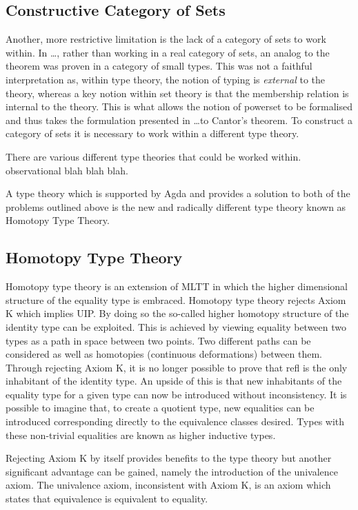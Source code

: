 \subsection{Constructive Category of Sets}
\label{section:hott}
Another, more restrictive limitation is the lack of a category of sets to work
within. In \ldots {}, rather than working in a
real category of sets, an analog to the theorem was proven in a category of
small types. This was not a faithful interpretation as, within type theory, the
notion of typing is \textit{external} to the theory, whereas a key notion within
set theory is that the membership relation is internal to the theory. This is
what allows the notion of powerset to be formalised and thus takes the
formulation presented in \ldots to Cantor's theorem. To construct a category of
sets it is necessary to work within a different type theory.

There are various different type theories that could be worked within.
observational blah blah blah.

A type theory which is supported by Agda and provides a solution to both of the
problems outlined above is the new and radically different type theory known as
Homotopy Type Theory.

\subsection{Homotopy Type Theory}

Homotopy type theory is an extension of MLTT in which the
higher dimensional structure of the equality type is embraced. Homotopy type
theory rejects \textsf{Axiom K} which implies UIP. By doing so the so-called higher
homotopy structure of the identity type can be exploited. This is achieved by
viewing equality between two types as a path in space between two points. Two
different paths can be considered as well as homotopies (continuous
deformations) between them. Through rejecting \textsf{Axiom K}, it is no longer
possible to prove that \textsf{refl} is the only inhabitant of the identity
type. An upside of this is that new inhabitants of the equality type for a given
type can now be introduced without inconsistency. It is possible to imagine
that, to create a quotient type, new equalities can be introduced corresponding
directly to the equivalence classes desired. Types with these non-trivial
equalities are known as higher inductive types.

Rejecting \textsf{Axiom K} by itself provides benefits to the type theory but
another significant advantage can be gained, namely the introduction of the
univalence axiom. The univalence axiom, inconsistent with
\textsf{Axiom K}, is an axiom which states that equivalence is equivalent to
equality.

